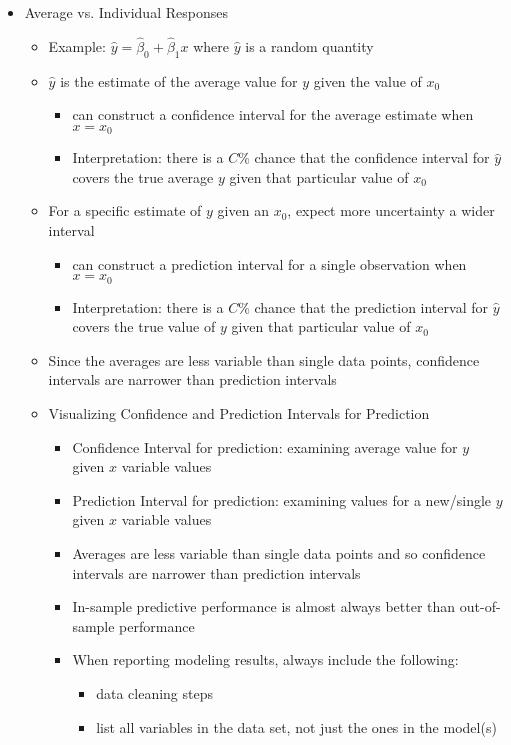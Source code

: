 \documentclass[12pt]{article}
\begin{document}
\begin{itemize}
\item Average vs. Individual Responses \begin{itemize} 
\item Example: $\hat{y} = \hat{\beta}_0 + \hat{\beta}_1x$ where $\hat{y}$ is a random quantity 
\item $\hat{y}$ is the estimate of the average value for $y$ given the value of $x_0$  \begin{itemize} 
\item can construct a confidence interval for the average estimate when $x = x_0$ 
\item Interpretation: there is a $C\%$ chance that the confidence interval for $\hat{y}$ covers the true average $y$ given that particular value of $x_0$ \end{itemize} 
\item For a specific estimate of $y$ given an $x_0$, expect more uncertainty a wider interval \begin{itemize} 
\item can construct a prediction interval for a single observation when $x=x_0$ 
\item Interpretation: there is a $C\%$ chance that the prediction interval for $\hat{y}$  covers the true value of $y$ given that particular value of $x_0$ \end{itemize} 
\item Since the averages are less variable than single data points, confidence intervals are narrower than prediction intervals 
\item Visualizing Confidence and Prediction Intervals for Prediction \begin{itemize} 
\item Confidence Interval for prediction: examining average value for $y$ given $x$ variable values 
\item Prediction Interval for prediction: examining values for a new/single $y$ given $x$ variable values 
\item Averages are less variable than single data points and so confidence intervals are narrower than prediction intervals 
\item In-sample predictive performance is almost always better than out-of-sample performance
\item When reporting modeling results, always include the following: \begin{itemize}
\item data cleaning steps 
\item list all variables in the data set, not just the ones in the model(s)

\end{itemize}
\end{itemize}
\end{itemize}
\end{itemize}
\end{document}
